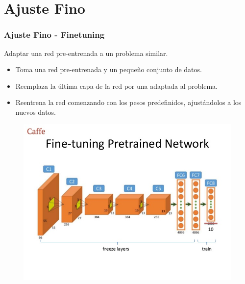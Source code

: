 \documentclass[10pt,center]{beamer}
\begin{document}
\section{Ajuste Fino}
\begin{frame}
  \frametitle{Ajuste Fino - Finetuning}
  Adaptar una red pre-entrenada a un problema similar.
    \begin{itemize}
     \item Toma una red pre-entrenada y un pequeño conjunto de datos.
     \item Reemplaza la última capa de la red por una adaptada al problema.
     \item Reentrena la red comenzando con los pesos predefinidos, ajustándolos a los nuevos datos.
    \end{itemize}
  \begin{figure}[h]
    \begin{center}
      \includegraphics[height=0.6\textheight]{./img/fine_tuning.jpg}
    \end{center}
  \end{figure}
\end{frame}
\end{document}
